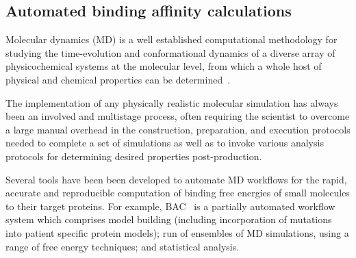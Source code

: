 
\subsection{Automated binding affinity calculations}

Molecular dynamics (MD) is a well established computational methodology for
studying the time-evolution and conformational dynamics of a diverse array of
physicochemical systems at the molecular level, from which a whole host of
physical and chemical properties can be determined~\cite{Karplus2005}.

The implementation of any physically realistic molecular simulation has
always been an involved and multistage process, often requiring the scientist
to overcome a large manual overhead in the construction, preparation, and
execution protocols needed to complete a set of simulations as well as to
invoke various analysis protocols for determining desired properties
post-production. 

Several tools have been been developed to automate %
MD workflows for the rapid, accurate and reproducible computation of binding
free energies of small molecules to their target proteins. For example,
BAC~\cite{Sadiq2008} is a partially automated workflow system which comprises
model building (including incorporation of mutations into patient specific
protein models); run of ensembles of MD simulations, using a range of free
energy techniques; and statistical analysis.


